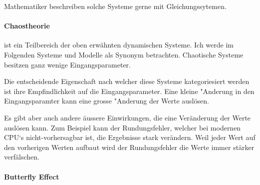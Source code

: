 Mathematiker beschreiben solche Systeme gerne mit Gleichungssytemen.

\paragraph{Chaostheorie} ist ein Teilbereich der oben erwähnten dynamischen Systeme. Ich werde im Folgenden Systeme und Modelle als Synonym betrachten. Chaotische Systeme besitzen ganz wenige Eingangsparameter.

Die entscheidende Eigenschaft nach welcher diese Systeme kategoriesiert werden ist ihre Empfindlichkeit auf die Eingangsparameter. Eine kleine "Anderung in den Eingangsparamter kann eine grosse "Anderung der Werte auslösen.

Es gibt aber auch andere äussere Einwirkungen, die eine Veränderung der Werte auslösen kann. Zum Beispiel kann der Rundungsfehler, welcher bei modernen CPU‘s nicht-vorhersagbar ist, die Ergebnisse stark verändern. Weil jeder Wert auf den vorherigen Werten aufbaut wird der Rundungsfehler die Werte immer stärker verfälschen.

\paragraph{Butterfly Effect}
